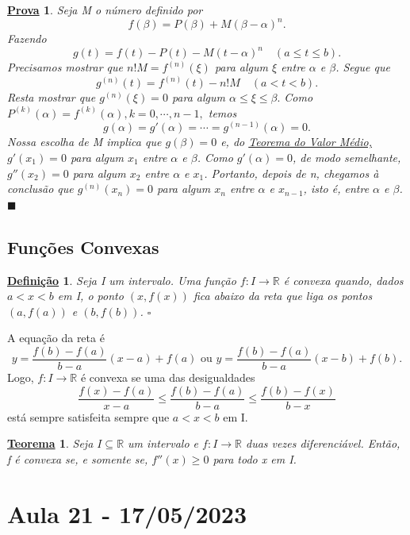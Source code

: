 \documentclass{article}
\newtheorem*{def*}{\underline{Defini\c c\~ao}}
\newtheorem*{theorem*}{\underline{Teorema}}
\newtheorem*{proof*}{\underline{Prova}}
\renewcommand\qedsymbol{$\blacksquare$}
\begin{document}
 \begin{proof*}
   Seja M o número definido por 
     \[
       f(\beta ) = P(\beta ) + M(\beta -\alpha )^{n}.
     \]
    Fazendo 
      \[
        g(t) = f(t) - P(t) - M(t-\alpha )^{n}\quad (a\leq t\leq b).
      \]
    Precisamos mostrar que \(n!M = f^{(n)}(\xi)\) para algum \(\xi\) entre 
  \(\alpha \) e \(\beta \). Segue que 
    \[
      g^{(n)}(t) = f^{(n)}(t) - n!M\quad (a < t < b).
    \]
    Resta mostrar que \(g^{(n)}(\xi) = 0\) para algum \(\alpha \leq \xi\leq \beta .\) 
    Como \(P^{(k)}(\alpha ) = f^{(k)}(\alpha ), k=0, \cdots, n-1,\) temos 
      \[
        g(\alpha ) = g'(\alpha ) = \cdots = g^{(n-1)}(\alpha ) = 0.
      \]
    Nossa escolha de M implica que \(g(\beta ) = 0\) e, do \hyperlink{mean_value}{Teorema
    do Valor Médio,} \(g'(x_{1}) = 0\) para algum \(x_{1}\) entre \(\alpha \) e \(\beta \).
    Como \(g'(\alpha ) = 0\), de modo semelhante, \(g''(x_{2}) = 0\) para algum
    \(x_{2}\) entre \(\alpha \) e \(x_{1} \). Portanto, depois de n, chegamos à conclusão
    que \(g^{(n)}(x_{n}) = 0\) para algum \(x_{n}\) entre \(\alpha \) e \(x_{n-1}\), isto é,
    entre \(\alpha \) e \(\beta \). \qedsymbol
 \end{proof*}
 \subsection{Fun\c cões Convexas}
\begin{def*}
  Seja I um intervalo. Uma fun\c cão \(f:I\rightarrow \mathbb{R}\) é convexa quando,
  dados \(a < x < b\) em I, o ponto \((x, f(x))\) fica abaixo da reta que
  liga os pontos \((a, f(a))\) e \((b, f(b))\). \(\square\)
\end{def*}
A equa\c cão da reta é 
  \[
    y = \frac{f(b)-f(a)}{b-a}(x-a)+f(a) \text{ ou } y = \frac{f(b)-f(a)}{b-a}(x-b)+f(b).
  \]
  Logo, \(f:I\rightarrow \mathbb{R}\) é convexa se uma das desigualdades 
    \[
      \frac{f(x) - f(a)}{x-a}\leq \frac{f(b) - f(a)}{b-a}\leq \frac{f(b)-f(x)}{b-x}
    \]
    está sempre satisfeita sempre que \(a < x < b\) em I. 
\hypertarget{convex_characterization}{ \begin{theorem*}
   Seja \(I\subseteq{\mathbb{R}}\) um intervalo e \(f:I\rightarrow \mathbb{R}\) duas vezes diferenciável.
   Então, f é convexa se, e somente se, \(f''(x)\geq 0\) para todo x em I.
 \end{theorem*}}
\newpage
\section{Aula 21 - 17/05/2023}
\end{document}
